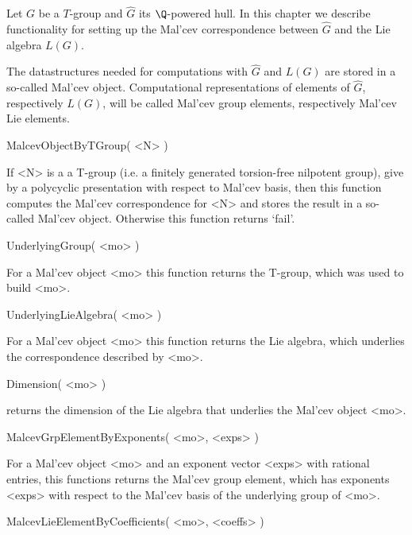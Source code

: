 


Let $G$ be a $T$-group
and $\hat{G}$ its $\Q$-powered hull.
In this chapter we describe functionality 
for setting up the 
Mal'cev correspondence
between $\hat{G}$ and the Lie algebra $L(G)$.

The datastructures needed for computations with $\hat{G}$ and 
$L(G)$ are 
stored in a so-called Mal'cev object.
Computational representations of 
elements of $\hat{G}$, respectively $L(G)$, 
will be called Mal'cev group elements, respectively 
Mal'cev Lie elements.

\> MalcevObjectByTGroup( <N> )

If <N> is a a T-group 
(i.e. a finitely generated torsion-free nilpotent group),
give by a polycyclic presentation with respect to Mal'cev basis,
then this function computes the Mal'cev correspondence for <N> 
and stores the result in a so-called Mal'cev object. 
Otherwise this function returns `fail'.

\> UnderlyingGroup( <mo> )

For a Mal'cev object <mo> this function returns the T-group,
which was used to build <mo>.

\> UnderlyingLieAlgebra( <mo> )

For a Mal'cev object <mo> this function returns the Lie algebra,
which underlies the correspondence described by <mo>.

\> Dimension( <mo> )

returns the dimension of the Lie algebra that underlies the Mal'cev object <mo>.

\> MalcevGrpElementByExponents( <mo>, <exps> )

For a Mal'cev object <mo> and an exponent vector <exps> with rational 
entries, this functions returns the Mal'cev group element, which 
has exponents <exps> with respect to the Mal'cev basis of the underlying
group of <mo>.

\> MalcevLieElementByCoefficients( <mo>, <coeffs> )

